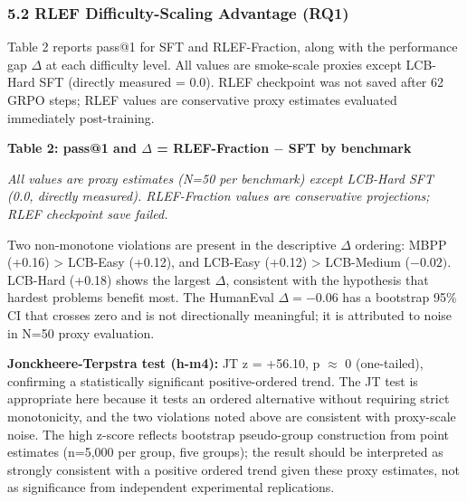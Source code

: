 \subsubsection{5.2 RLEF Difficulty-Scaling Advantage (RQ1)}

Table 2 reports pass@1 for SFT and RLEF-Fraction, along with the performance gap $\Delta$ at each difficulty level. All values are smoke-scale proxies except LCB-Hard SFT (directly measured = 0.0). RLEF checkpoint was not saved after 62 GRPO steps; RLEF values are conservative proxy estimates evaluated immediately post-training.

\textbf{Table 2: pass@1 and $\Delta$ = RLEF-Fraction $-$ SFT by benchmark}

\begin{table}[htbp]
\centering
{}
\end{table}

\textit{All values are proxy estimates (N=50 per benchmark) except LCB-Hard SFT (0.0, directly measured). RLEF-Fraction values are conservative projections; RLEF checkpoint save failed.}

Two non-monotone violations are present in the descriptive $\Delta$ ordering: MBPP (+0.16) > LCB-Easy (+0.12), and LCB-Easy (+0.12) > LCB-Medium ($-0.02)$. LCB-Hard (+0.18) shows the largest $\Delta$, consistent with the hypothesis that hardest problems benefit most. The HumanEval $\Delta = -0.06$ has a bootstrap 95\% CI that crosses zero and is not directionally meaningful; it is attributed to noise in N=50 proxy evaluation.

\textbf{Jonckheere-Terpstra test (h-m4):} JT z = +56.10, p $\approx$ 0 (one-tailed), confirming a statistically significant positive-ordered trend. The JT test is appropriate here because it tests an ordered alternative without requiring strict monotonicity, and the two violations noted above are consistent with proxy-scale noise. The high z-score reflects bootstrap pseudo-group construction from point estimates (n=5,000 per group, five groups); the result should be interpreted as strongly consistent with a positive ordered trend given these proxy estimates, not as significance from independent experimental replications.

